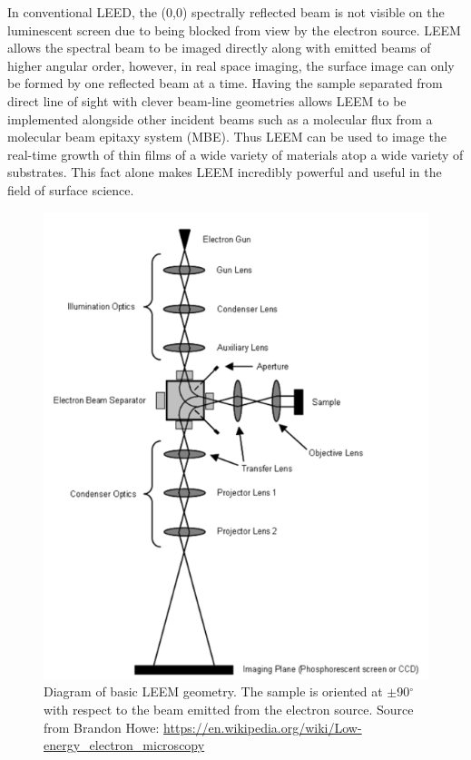 In conventional LEED, the (0,0) spectrally reflected beam is not visible on the luminescent screen due to being blocked from view by the electron source. LEEM allows the spectral beam to be imaged directly along with emitted beams of higher angular order, however, in real space imaging, the surface image can only be formed by one  reflected beam at a time. Having the sample separated from direct line of sight with clever beam-line geometries allows LEEM to be implemented alongside other incident beams such as a molecular flux from a molecular beam epitaxy system (MBE). Thus LEEM can be used to image the real-time growth of thin films of a wide variety of materials atop a wide variety of substrates. This fact alone makes LEEM incredibly powerful and useful in the field of surface science. 
\begin{figure}
\centering
\includegraphics[scale=1.1]{figs/LEEMGeo-150.png}
\caption{Diagram of basic LEEM geometry. The sample is oriented at $\pm$90$^{\circ}$ with respect to the beam emitted from the electron source. Source from Brandon Howe: \protect\url{https://en.wikipedia.org/wiki/Low-energy_electron_microscopy}}
\label{fig:LEEM-Geometry}
\end{figure}
	
